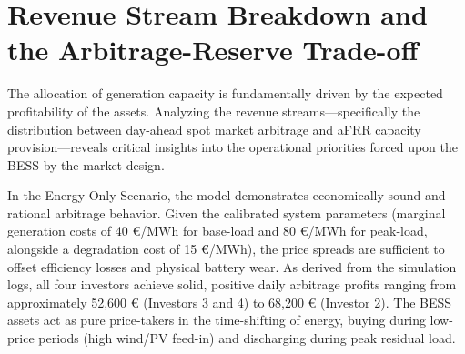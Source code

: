 \begin{table}[htpb]
    \centering
    \caption{Aggregated BESS investment metrics comparing the Energy-Only and Multi-Service scenarios.}
    \label{tab:investment_stats}
\end{table}

\section{Revenue Stream Breakdown and the Arbitrage-Reserve Trade-off} \label{sec:revenue_breakdown}

The allocation of generation capacity is fundamentally driven by the expected profitability of the assets. Analyzing the revenue streams—specifically the distribution between day-ahead spot market arbitrage and aFRR capacity provision—reveals critical insights into the operational priorities forced upon the BESS by the market design. 

In the Energy-Only Scenario, the model demonstrates economically sound and rational arbitrage behavior. Given the calibrated system parameters (marginal generation costs of 40 €/MWh for base-load and 80 €/MWh for peak-load, alongside a degradation cost of 15 €/MWh), the price spreads are sufficient to offset efficiency losses and physical battery wear. As derived from the simulation logs, all four investors achieve solid, positive daily arbitrage profits ranging from approximately 52,600 € (Investors 3 and 4) to 68,200 € (Investor 2). The BESS assets act as pure price-takers in the time-shifting of energy, buying during low-price periods (high wind/PV feed-in) and discharging during peak residual load.

